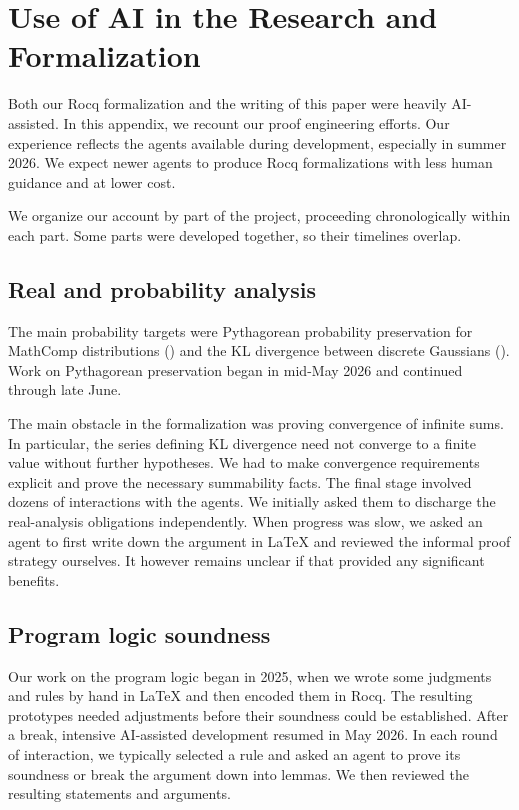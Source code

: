 \section{Use of AI in the Research and Formalization}
\label{app:ai-assistance}

Both our Rocq formalization and the writing of this paper were heavily AI-assisted.
In this appendix, we recount our proof engineering efforts.
Our experience reflects the agents available during development,
especially in summer 2026.
We expect newer agents to produce Rocq formalizations with less human guidance and at lower cost.

We organize our account by part of the project, proceeding chronologically within each part.
Some parts were developed together, so their timelines overlap.

\subsection{Real and probability analysis}

The main probability targets were Pythagorean probability preservation for
MathComp distributions () and the
KL divergence between discrete Gaussians ().
Work on Pythagorean preservation began in mid-May 2026 and continued through late June.

The main obstacle in the formalization was proving convergence of infinite sums.
In particular, the series defining KL divergence need not converge to a finite value without further hypotheses.
We had to make convergence requirements explicit and prove the necessary summability facts.
The final stage involved dozens of interactions with the agents.
We initially asked them to discharge the real-analysis obligations independently.
When progress was slow, we asked an agent to first write down the argument in LaTeX and reviewed the informal proof strategy ourselves.
It however remains unclear if that provided any significant benefits.

\subsection{Program logic soundness}

Our work on the program logic began in 2025,
when we wrote some judgments and rules by hand in LaTeX and then encoded them in Rocq.
The resulting prototypes needed adjustments before their soundness could be established.
After a break, intensive AI-assisted development resumed in May 2026.
In each round of interaction, we typically selected a rule
and asked an agent to prove its soundness or break the argument down into lemmas.
We then reviewed the resulting statements and arguments.

